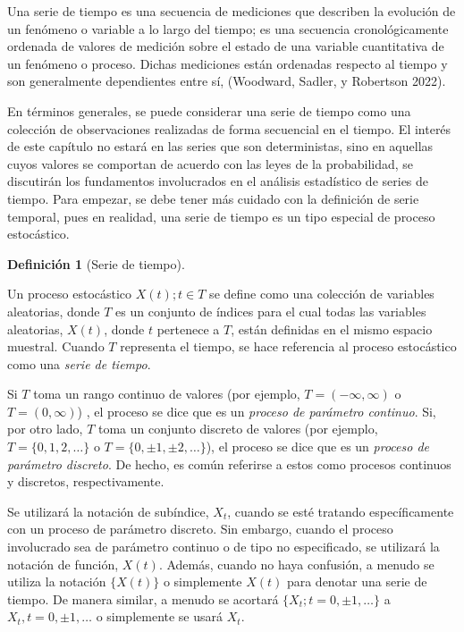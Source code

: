 \documentclass[
  letterpaper,
  DIV=11,
  numbers=noendperiod]{scrreport}
\theoremstyle{plain}
\theoremstyle{definition}
\newtheorem{definition}{Definición}[chapter]
\theoremstyle{definition}
\theoremstyle{plain}
\theoremstyle{remark}
\begin{document}
Una serie de tiempo es una secuencia de mediciones que describen la
evolución de un fenómeno o variable a lo largo del tiempo; es una
secuencia cronológicamente ordenada de valores de medición sobre el
estado de una variable cuantitativa de un fenómeno o proceso. Dichas
mediciones están ordenadas respecto al tiempo y son generalmente
dependientes entre sí, (Woodward, Sadler, y Robertson 2022).

En términos generales, se puede considerar una serie de tiempo como una
colección de observaciones realizadas de forma secuencial en el tiempo.
El interés de este capítulo no estará en las series que son
deterministas, sino en aquellas cuyos valores se comportan de acuerdo
con las leyes de la probabilidad, se discutirán los fundamentos
involucrados en el análisis estadístico de series de tiempo. Para
empezar, se debe tener más cuidado con la definición de serie temporal,
pues en realidad, una serie de tiempo es un tipo especial de proceso
estocástico.

\begin{definition}[Serie de
tiempo]\protect\hypertarget{def-ts}{}\label{def-ts}

Un proceso estocástico \(X(t); t\in T\) se define como una colección de
variables aleatorias, donde \(T\) es un conjunto de índices para el cual
todas las variables aleatorias, \(X(t)\), donde \(t\) pertenece a \(T\),
están definidas en el mismo espacio muestral. Cuando \(T\) representa el
tiempo, se hace referencia al proceso estocástico como una \emph{serie
de tiempo}.

\end{definition}

Si \(T\) toma un rango continuo de valores (por ejemplo,
\(T=(-\infty,\infty)\) o \(T=(0,\infty)\)) , el proceso se dice que es
un \emph{proceso de parámetro continuo}. Si, por otro lado, \(T\) toma
un conjunto discreto de valores (por ejemplo, \(T = \{0, 1, 2,\ldots\}\)
o \(T = \{0, \pm 1, \pm 2,\ldots \}\)), el proceso se dice que es un
\emph{proceso de parámetro discreto}. De hecho, es común referirse a
estos como procesos continuos y discretos, respectivamente.

Se utilizará la notación de subíndice, \(X_t\), cuando se esté tratando
específicamente con un proceso de parámetro discreto. Sin embargo,
cuando el proceso involucrado sea de parámetro continuo o de tipo no
especificado, se utilizará la notación de función, \(X(t)\). Además,
cuando no haya confusión, a menudo se utiliza la notación \(\{X(t)\}\) o
simplemente \(X(t)\) para denotar una serie de tiempo. De manera
similar, a menudo se acortará \(\{X_t;t=0,\pm 1,\ldots \}\) a
\(X_t,t=0,\pm 1,\ldots\) o simplemente se usará \(X_t\).
\end{document}
